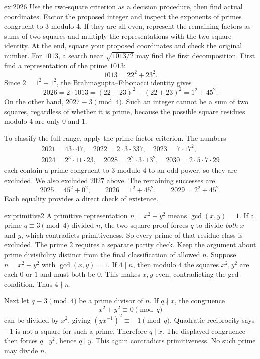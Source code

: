 \begin{solution}{ex:2026}
\idea Use the two-square criterion as a decision procedure, then find actual coordinates. Factor the proposed integer and inspect the exponents of primes congruent to $3$ modulo $4$. If they are all even, represent the remaining factors as sums of two squares and multiply the representations with the two-square identity. At the end, square your proposed coordinates and check the original number. For $1013$, a search near $\sqrt{1013/2}$ may find the first decomposition.
\writeup First find a representation of the prime $1013$:
\[
1013=22^2+23^2.
\]
Since $2=1^2+1^2$, the Brahmagupta--Fibonacci identity gives
\[
2026=2\cdot1013=(22-23)^2+(22+23)^2=1^2+45^2.
\]
On the other hand, $2027\equiv3\pmod4$. Such an integer cannot be a sum of two squares, regardless of whether it is prime, because the possible square residues modulo $4$ are only $0$ and $1$.

To classify the full range, apply the prime-factor criterion. The numbers
\[
\begin{gathered}
2021=43\cdot47,\quad 2022=2\cdot3\cdot337,\quad
2023=7\cdot17^2,\\
2024=2^3\cdot11\cdot23,\quad
2028=2^2\cdot3\cdot13^2,\quad
2030=2\cdot5\cdot7\cdot29
\end{gathered}
\]
each contain a prime congruent to $3$ modulo $4$ to an odd power, so they are excluded. We also excluded $2027$ above. The remaining successes are
\[
2025=45^2+0^2,\qquad
2026=1^2+45^2,\qquad
2029=2^2+45^2.
\]
Each equality provides a direct check of existence.
\end{solution}

\begin{solution}{ex:primitive2}
\idea A primitive representation $n=x^2+y^2$ means $\gcd(x,y)=1$. If a prime $q\equiv3\pmod4$ divided $n$, the two-square proof forces $q$ to divide \emph{both} $x$ and $y$, which contradicts primitiveness. So every prime of that residue class is excluded. The prime $2$ requires a separate parity check. Keep the argument about prime divisibility distinct from the final classification of allowed $n$.
\writeup Suppose $n=x^2+y^2$ with $\gcd(x,y)=1$. If $4\mid n$, then modulo $4$ the squares $x^2,y^2$ are each $0$ or $1$ and must both be $0$. This makes $x,y$ even, contradicting the gcd condition. Thus $4\nmid n$.

Next let $q\equiv3\pmod4$ be a prime divisor of $n$. If $q\nmid x$, the congruence
\[
x^2+y^2\equiv0\pmod q
\]
can be divided by $x^2$, giving $(yx^{-1})^2\equiv-1\pmod q$. Quadratic reciprocity says $-1$ is not a square for such a prime. Therefore $q\mid x$. The displayed congruence then forces $q\mid y^2$, hence $q\mid y$. This again contradicts primitiveness. No such prime may divide $n$.
\end{solution}

